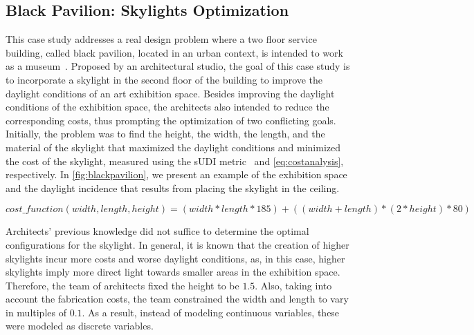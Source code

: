 \subsection{Black Pavilion: Skylights Optimization}
This case study addresses a real design problem where a two floor service building, called black pavilion, located in an urban context, is intended to work as a museum~\cite{Caetano2018,IP2019MOO}. Proposed by an architectural studio, the goal of this case study is to incorporate a skylight in the second floor of the building to improve the daylight conditions of an art exhibition space. Besides improving the daylight conditions of the exhibition space, the architects also intended to reduce the corresponding costs, thus prompting the optimization of two conflicting goals. Initially, the problem was to find the height, the width, the length, and the material of the skylight that maximized the daylight conditions and minimized the cost of the skylight, measured using the \ac{sUDI} metric~\cite{Nabil2006} and \cref{eq:costanalysis}, respectively. In \cref{fig:blackpavilion}, we present an example of the exhibition space and the daylight incidence that results from placing the skylight in the ceiling.

\begin{equation} \label{eq:costanalysis}
cost\_function(width, length, height) = (width * length * 185) + ((width + length) * ( 2 * height) * 80)
\end{equation}

Architects' previous knowledge did not suffice to determine the optimal configurations for the skylight. In general, it is known that the creation of higher skylights incur more costs and worse daylight conditions, as, in this case, higher skylights imply more direct light towards smaller areas in the exhibition space. Therefore, the team of architects fixed the height to be $1.5$\metre. Also, taking into account the fabrication costs, the team constrained the width and length to vary in multiples of $0.1$\metre. As a result, instead of modeling continuous variables, these were modeled as discrete variables.

